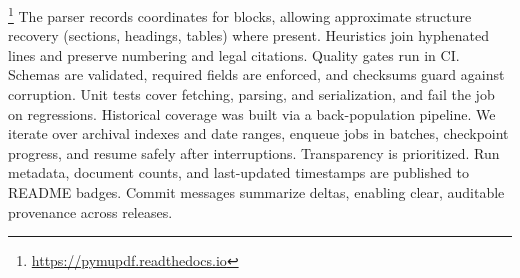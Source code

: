 \documentclass[10pt,a4paper]{article}%
\begin{document}
\footnote{\href{https://pymupdf.readthedocs.io}{https://pymupdf.readthedocs.io}}%
\newline%
\newline%
The parser records coordinates for blocks, allowing approximate structure recovery (sections, headings, tables) where present. Heuristics join hyphenated lines and preserve numbering and legal citations.%
\citep{DocumentLayoutAnalysis2021}%
\newline%
\newline%
Quality gates run in CI. Schemas are validated, required fields are enforced, and checksums guard against corruption. Unit tests cover fetching, parsing, and serialization, and fail the job on regressions.%
\citep{DataQuality2022}%
\newline%
\newline%
Historical coverage was built via a back{-}population pipeline. We iterate over archival indexes and date ranges, enqueue jobs in batches, checkpoint progress, and resume safely after interruptions.%
\citep{HistoricalWebData2019}%
\newline%
\newline%
Transparency is prioritized. Run metadata, document counts, and last{-}updated timestamps are published to README badges. Commit messages summarize deltas, enabling clear, auditable provenance across releases.%
\citep{OpenDataPractices2020}%
\newline%
\newline

%
\end{document}
